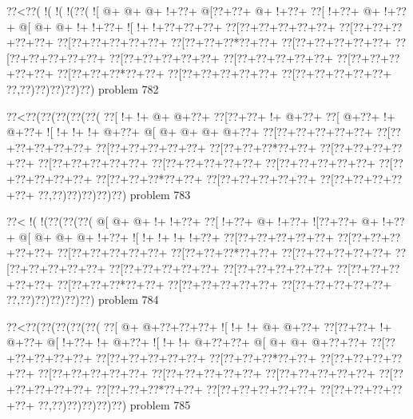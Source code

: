\vbox{\vbox{\goo
\0??<\0??(\- !(\- !(\- !(\0??(
\- ![\- @+\- @+\- @+\- !+\0??+
\- @[\0??+\0??+\- @+\- !+\0??+
\0??[\- !+\0??+\- @+\- !+\0??+
\- @[\- @+\- @+\- !+\- !+\0??+
\- ![\- !+\- !+\0??+\0??+\0??+
\0??[\0??+\0??+\0??+\0??+\0??+
\0??[\0??+\0??+\0??+\0??+\0??+
\0??[\0??+\0??+\0??+\0??+\0??+
\0??[\0??+\0??+\0??*\0??+\0??+
\0??[\0??+\0??+\0??+\0??+\0??+
\0??[\0??+\0??+\0??+\0??+\0??+
\0??[\0??+\0??+\0??+\0??+\0??+
\0??[\0??+\0??+\0??+\0??+\0??+
\0??[\0??+\0??+\0??+\0??+\0??+
\0??[\0??+\0??+\0??*\0??+\0??+
\0??[\0??+\0??+\0??+\0??+\0??+
\0??[\0??+\0??+\0??+\0??+\0??+
\0??,\0??)\0??)\0??)\0??)\0??)
}
\hfil problem 782\hfil\break
}

\vbox{\vbox{\goo
\0??<\0??(\0??(\0??(\0??(\0??(
\0??[\- !+\- !+\- @+\- @+\0??+
\0??[\0??+\0??+\- !+\- @+\0??+
\0??[\- @+\0??+\- !+\- @+\0??+
\- ![\- !+\- !+\- !+\- @+\0??+
\- @[\- @+\- @+\- @+\- @+\0??+
\0??[\0??+\0??+\0??+\0??+\0??+
\0??[\0??+\0??+\0??+\0??+\0??+
\0??[\0??+\0??+\0??+\0??+\0??+
\0??[\0??+\0??+\0??*\0??+\0??+
\0??[\0??+\0??+\0??+\0??+\0??+
\0??[\0??+\0??+\0??+\0??+\0??+
\0??[\0??+\0??+\0??+\0??+\0??+
\0??[\0??+\0??+\0??+\0??+\0??+
\0??[\0??+\0??+\0??+\0??+\0??+
\0??[\0??+\0??+\0??*\0??+\0??+
\0??[\0??+\0??+\0??+\0??+\0??+
\0??[\0??+\0??+\0??+\0??+\0??+
\0??,\0??)\0??)\0??)\0??)\0??)
}
\hfil problem 783\hfil\break
}

\vbox{\vbox{\goo
\0??<\- !(\- !(\0??(\0??(\0??(
\- @[\- @+\- @+\- !+\- !+\0??+
\0??[\- !+\0??+\- @+\- !+\0??+
\- ![\0??+\0??+\- @+\- !+\0??+
\- @[\- @+\- @+\- @+\- !+\0??+
\- ![\- !+\- !+\- !+\- !+\0??+
\0??[\0??+\0??+\0??+\0??+\0??+
\0??[\0??+\0??+\0??+\0??+\0??+
\0??[\0??+\0??+\0??+\0??+\0??+
\0??[\0??+\0??+\0??*\0??+\0??+
\0??[\0??+\0??+\0??+\0??+\0??+
\0??[\0??+\0??+\0??+\0??+\0??+
\0??[\0??+\0??+\0??+\0??+\0??+
\0??[\0??+\0??+\0??+\0??+\0??+
\0??[\0??+\0??+\0??+\0??+\0??+
\0??[\0??+\0??+\0??*\0??+\0??+
\0??[\0??+\0??+\0??+\0??+\0??+
\0??[\0??+\0??+\0??+\0??+\0??+
\0??,\0??)\0??)\0??)\0??)\0??)
}
\hfil problem 784\hfil\break
}

\vbox{\vbox{\goo
\0??<\0??(\0??(\0??(\0??(\0??(
\0??[\- @+\- @+\0??+\0??+\0??+
\- ![\- !+\- !+\- @+\- @+\0??+
\0??[\0??+\0??+\- !+\- @+\0??+
\- @[\- !+\0??+\- !+\- @+\0??+
\- ![\- !+\- !+\- @+\0??+\0??+
\- @[\- @+\- @+\- @+\0??+\0??+
\0??[\0??+\0??+\0??+\0??+\0??+
\0??[\0??+\0??+\0??+\0??+\0??+
\0??[\0??+\0??+\0??*\0??+\0??+
\0??[\0??+\0??+\0??+\0??+\0??+
\0??[\0??+\0??+\0??+\0??+\0??+
\0??[\0??+\0??+\0??+\0??+\0??+
\0??[\0??+\0??+\0??+\0??+\0??+
\0??[\0??+\0??+\0??+\0??+\0??+
\0??[\0??+\0??+\0??*\0??+\0??+
\0??[\0??+\0??+\0??+\0??+\0??+
\0??[\0??+\0??+\0??+\0??+\0??+
\0??,\0??)\0??)\0??)\0??)\0??)
}
\hfil problem 785\hfil\break
}

